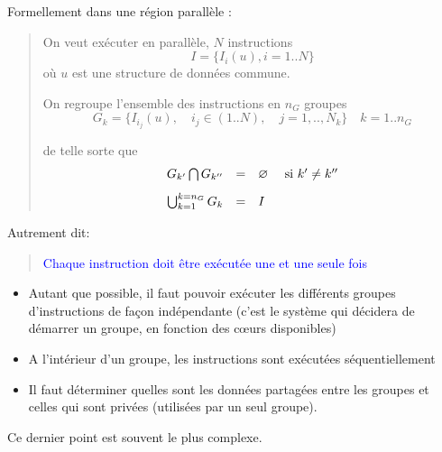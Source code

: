 \documentclass{beamer}
\begin{document}
\begin{frame}[fragile]
	Formellement dans une région parallèle :
	
	\bigskip
	\begin{quote}
On veut exécuter en parallèle, $N$ instructions 
$$
I = \{ I_i(u), i=1 .. N\}
$$ 
où $u$ est une structure de données commune.

\bigskip
On regroupe l'ensemble des instructions en $n_G$ groupes 
$$
G_k = \{ I_{i_j}(u),\quad i_j \in (1..N),\quad j=1,..,N_k\} \quad k = 1 .. n_G
$$

de telle sorte que
$$
\begin{array}{rcl}
G_{k'} \bigcap G_{k''} &=& \varnothing\quad \hbox{ si } k' \neq k'' \\[0.3cm]
\bigcup_{k=1}^{k=n_G} G_k &=& I
\end{array}
$$ 
\end{quote}
	
\end{frame}

\begin{frame}
	
Autrement dit:
\begin{quote}
\textcolor{blue}{Chaque instruction doit être exécutée une et une seule fois} 
\end{quote}

\vfill
\begin{itemize}
	\item Autant que possible, il faut pouvoir exécuter les différents groupes d'instructions de façon indépendante (c'est le système qui décidera de démarrer un groupe, en fonction des c\oe urs disponibles)
	
	\item A l'intérieur d'un groupe, les instructions sont exécutées séquentiellement
	
	\item Il faut déterminer quelles sont les données partagées entre les groupes et celles qui sont privées (utilisées par un seul groupe).  
\end{itemize}

\vfill
Ce dernier point est souvent le plus complexe.
\end{frame}
\end{document}
